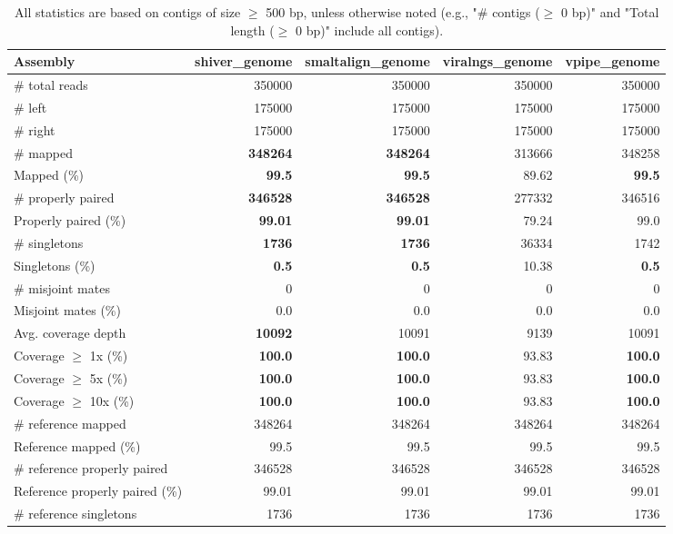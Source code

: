 \documentclass[12pt,a4paper]{article}
\begin{document}
\begin{table}[ht]
\begin{center}
\caption{All statistics are based on contigs of size $\geq$ 500 bp, unless otherwise noted (e.g., "\# contigs ($\geq$ 0 bp)" and "Total length ($\geq$ 0 bp)" include all contigs).}
\begin{tabular}{|l*{4}{|r}|}
\hline
Assembly & shiver\_genome & smaltalign\_genome & viralngs\_genome & vpipe\_genome \\ \hline
\# total reads & 350000 & 350000 & 350000 & 350000 \\ \hline
\# left & 175000 & 175000 & 175000 & 175000 \\ \hline
\# right & 175000 & 175000 & 175000 & 175000 \\ \hline
\# mapped & {\bf 348264} & {\bf 348264} & 313666 & 348258 \\ \hline
Mapped (\%) & {\bf 99.5} & {\bf 99.5} & 89.62 & {\bf 99.5} \\ \hline
\# properly paired & {\bf 346528} & {\bf 346528} & 277332 & 346516 \\ \hline
Properly paired (\%) & {\bf 99.01} & {\bf 99.01} & 79.24 & 99.0 \\ \hline
\# singletons & {\bf 1736} & {\bf 1736} & 36334 & 1742 \\ \hline
Singletons (\%) & {\bf 0.5} & {\bf 0.5} & 10.38 & {\bf 0.5} \\ \hline
\# misjoint mates & 0 & 0 & 0 & 0 \\ \hline
Misjoint mates (\%) & 0.0 & 0.0 & 0.0 & 0.0 \\ \hline
Avg. coverage depth & {\bf 10092} & 10091 & 9139 & 10091 \\ \hline
Coverage $\geq$ 1x (\%) & {\bf 100.0} & {\bf 100.0} & 93.83 & {\bf 100.0} \\ \hline
Coverage $\geq$ 5x (\%) & {\bf 100.0} & {\bf 100.0} & 93.83 & {\bf 100.0} \\ \hline
Coverage $\geq$ 10x (\%) & {\bf 100.0} & {\bf 100.0} & 93.83 & {\bf 100.0} \\ \hline
\# reference mapped & 348264 & 348264 & 348264 & 348264 \\ \hline
Reference mapped (\%) & 99.5 & 99.5 & 99.5 & 99.5 \\ \hline
\# reference properly paired & 346528 & 346528 & 346528 & 346528 \\ \hline
Reference properly paired (\%) & 99.01 & 99.01 & 99.01 & 99.01 \\ \hline
\# reference singletons & 1736 & 1736 & 1736 & 1736 \\ \hline

\end{tabular}
\end{center}
\end{table}
\end{document}
